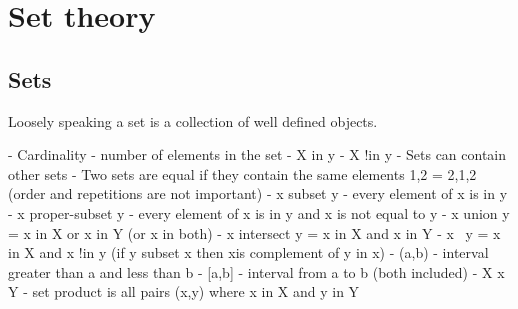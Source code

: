 \chapter{Set theory}
%

\section{Sets}
Loosely speaking a set is a collection of well defined objects. 

    - Cardinality - number of elements in the set
    - X in y
    - X !in y
    - Sets can contain other sets
    - Two sets are equal if they contain the same elements {1,2} = {2,1,2} (order and repetitions are not important)
    - x subset y - every element of x is in y
    - x proper-subset y - every element of x is in y and x is not equal to y
    - x union y = x in X or x in Y (or x in both)
    - x intersect y = x in X and x in Y
    - x \ y = x in X and x !in y (if y subset x then x\y is complement of y in x)
    - (a,b) - interval greater than a and less than b
    - [a,b] - interval from a to b (both included)
    - X x Y - set product is all pairs (x,y) where x in X and y in Y

